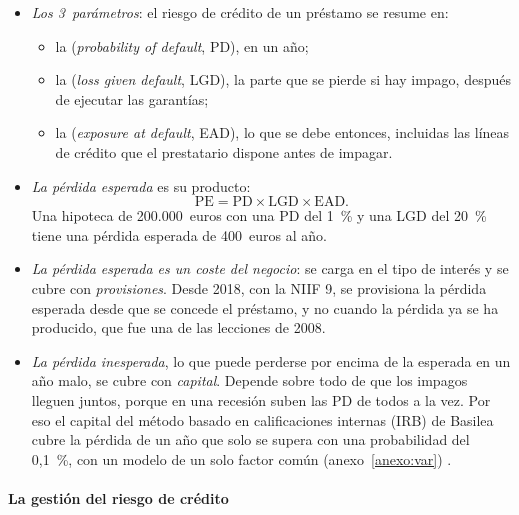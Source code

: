 \documentclass[11pt]{article}
\begin{document}
\begin{itemize}
\item \emph{Los 3~parámetros}: el riesgo de crédito de un préstamo se resume en:
  \begin{itemize}
  \item la  (\emph{probability of default}, PD), en un año;
  \item la  (\emph{loss given default}, LGD), la parte que se pierde si hay impago, después de ejecutar las garantías;
  \item la  (\emph{exposure at default}, EAD), lo que se debe entonces, incluidas las líneas de crédito que el prestatario dispone antes de impagar.
  \end{itemize}
\item \emph{La pérdida esperada} es su producto:
  \begin{equation}\label{eq:perdida-esperada}
  \mathrm{PE}=\mathrm{PD}\times\mathrm{LGD}\times\mathrm{EAD}.
  \end{equation}
  Una hipoteca de 200.000~euros con una PD del 1~\% y una LGD del 20~\% tiene una pérdida esperada de 400~euros al año.
\item \emph{La pérdida esperada es un coste del negocio}: se carga en el tipo de interés y se cubre con \emph{provisiones}. Desde 2018, con la NIIF 9, se provisiona la pérdida esperada desde que se concede el préstamo, y no cuando la pérdida ya se ha producido, que fue una de las lecciones de 2008\nocite{IASB2014NIIF9}.
\item \emph{La pérdida inesperada}, lo que puede perderse por encima de la esperada en un año malo, se cubre con \emph{capital}. Depende sobre todo de que los impagos lleguen juntos, porque en una recesión suben las PD de todos a la vez. Por eso el capital del método basado en calificaciones internas (IRB) de Basilea cubre la pérdida de un año que solo se supera con una probabilidad del 0,1~\%, con un modelo de un solo factor común\nocite{Vasicek2002,Gordy2003} (anexo~\ref{anexo:var}) .
\end{itemize}

\paragraph{La gestión del riesgo de crédito}
\end{document}
